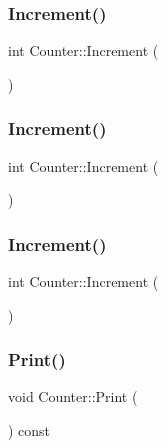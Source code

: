 \subsubsection{\texorpdfstring{Increment()}{Increment()}\hspace{0.1cm}{\footnotesize\ttfamily [1/3]}}
{\footnotesize\ttfamily int Counter\+::\+Increment (\begin{DoxyParamCaption}{ }\end{DoxyParamCaption})}

\mbox{\label{class_counter_a0a0ca9fdb580a2aec9a5a62ebed2b5ab}} 
\subsubsection{\texorpdfstring{Increment()}{Increment()}\hspace{0.1cm}{\footnotesize\ttfamily [2/3]}}
{\footnotesize\ttfamily int Counter\+::\+Increment (\begin{DoxyParamCaption}{ }\end{DoxyParamCaption})}

\mbox{\label{class_counter_a0a0ca9fdb580a2aec9a5a62ebed2b5ab}} 
\subsubsection{\texorpdfstring{Increment()}{Increment()}\hspace{0.1cm}{\footnotesize\ttfamily [3/3]}}
{\footnotesize\ttfamily int Counter\+::\+Increment (\begin{DoxyParamCaption}{ }\end{DoxyParamCaption})}

\mbox{\label{class_counter_a80092ec2a0deea0870b2e9f8ad0906bd}} 
\subsubsection{\texorpdfstring{Print()}{Print()}\hspace{0.1cm}{\footnotesize\ttfamily [1/3]}}
{\footnotesize\ttfamily void Counter\+::\+Print (\begin{DoxyParamCaption}{ }\end{DoxyParamCaption}) const}

